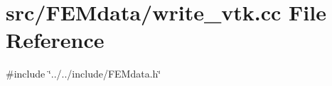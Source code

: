 \section{src/\+F\+E\+Mdata/write\+\_\+vtk.cc File Reference}
\label{write__vtk_8cc}
{\ttfamily \#include \char`\"{}../../include/\+F\+E\+Mdata.\+h\char`\"{}}\newline
